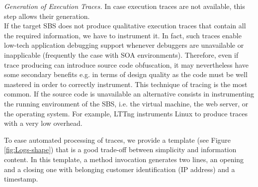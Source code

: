 \noindent \emph{Generation of Execution Traces.} In case execution traces are not available, this step allows their generation.
\vspace{.15cm}
\\
\noindent If the target SBS does not produce qualitative execution traces that contain all the required information, we have to instrument it.  
In fact, such traces enable low-tech application debugging support whenever
debuggers are unavailable or inapplicable (frequently the case with
SOA environments). Therefore, even if 
trace producing can introduce source code obfuscation, it may nevertheless have some secondary benefits
e.g. in terms of design quality as the code must be well mastered in order to correctly instrument.
This technique of tracing is the most common. If the source code is unavailable an alternative consists in instrumenting the running environment of the SBS, i.e.  the virtual machine, the web server, or the operating system. For example, LTTng \cite{Fournier2009} instruments Linux to produce traces with a very low overhead.


To ease automated processing of traces, we provide a template (see Figure \ref{fig:Logs-shape}) that is a good trade-off between simplicity and information content. In this template, a method invocation generates two lines, an opening and a closing one with belonging customer identification (IP address) and a timestamp.


